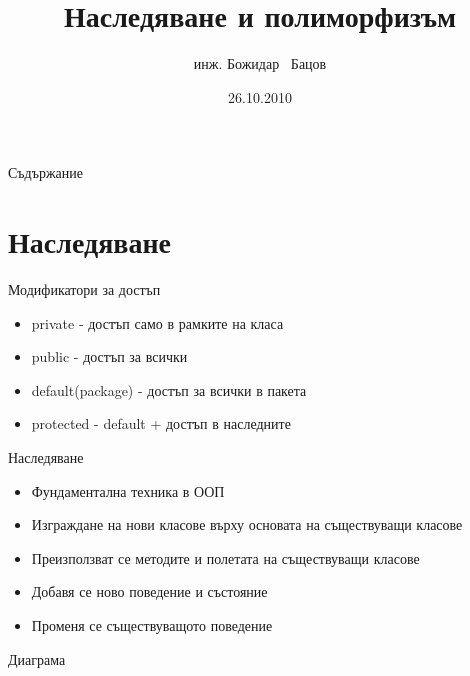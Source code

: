 \documentclass{beamer}
\title{Наследяване и полиморфизъм}
\author{инж. Божидар ~Бацов}
\institute{Drow Ltd.}
\date{26.10.2010}
\begin{document}
\begin{frame}
  \titlepage
\end{frame}

\begin{frame}{Съдържание}
  \tableofcontents
\end{frame}




\section{Наследяване}

\begin{frame}{Модификатори за достъп}
  \begin{itemize}
  \item private - достъп само в рамките на класа
  \item public - достъп за всички
  \item default(package) - достъп за всички в пакета
  \item protected - default + достъп в наследните
  \end{itemize}
\end{frame}

\begin{frame}{Наследяване}
  \transdissolve
  \begin{itemize}
  \item Фундаментална техника в ООП
  \item Изграждане на нови класове върху основата на съществуващи
    класове
  \item Преизползват се методите и полетата на съществуващи класове
  \item Добавя се ново поведение и състояние
  \item Променя се съществуващото поведение
  \end{itemize}
\end{frame}


\begin{frame}{Диаграма}
  \transdissolve
  
\end{frame}
\end{document}
